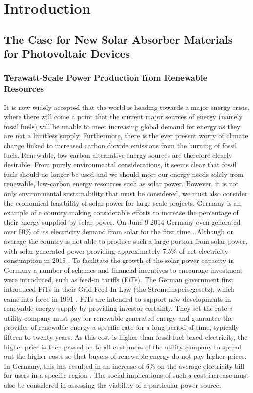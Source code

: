 \chapter{Introduction}

\section{The Case for New Solar Absorber Materials for Photovoltaic Devices}

\subsection{Terawatt-Scale Power Production from Renewable Resources}

It is now widely accepted that the world is heading towards a major energy crisis, where there will come a point that the current major sources of energy (namely fossil fuels) will be unable to meet increasing global demand for energy as they are not a limitless supply. Furthermore, there is the ever present worry of climate change linked to increased carbon dioxide emissions from the burning of fossil fuels. Renewable, low-carbon alternative energy sources are therefore clearly desirable. From purely environmental considerations, it seems clear that fossil fuels should no longer be used and we should meet our energy needs solely from renewable, low-carbon energy resources such as solar power. However, it is not only environmental sustainability that must be considered, we must also consider the economical feasibility of solar power for large-scale projects. Germany is an example of a country making considerable efforts to increase the percentage of their energy supplied by solar power. On June 9 2014 Germany even generated over 50\% of its electricity demand from solar for the first time \cite{Germany_guardian_news}. Although on average the country is not able to produce such a large portion from solar power, with solar-generated power providing approximately 7.5\% of net electricity consumption in 2015 \cite{Germany_PV}. To facilitate the growth of the solar power capacity in Germany a number of schemes and financial incentives to encourage investment were introduced, such as feed-in tariffs (FiTs).
The German government first introduced FiTs in their Grid Feed-In Law (the Stromeinspeisegesetz), which came into force in 1991 \cite{Germany_Lang}. FiTs are intended to support new developments in renewable energy supply by providing investor certainty. They set the rate a utility company must pay for renewable generated energy and guarantee the provider of renewable energy a specific rate for a long period of time, typically fifteen to twenty years. As this cost is higher than fossil fuel based electricity, the higher price is then passed on to all customers of the utility company to spread out the higher costs so that buyers of renewable energy do not pay higher prices. In Germany, this has resulted in an increase of 6\% on the average electricity bill for users in a specific region \cite{Germany_Oregon}. The social implications of such a cost increase must also be considered in assessing the viability of a particular power source.


